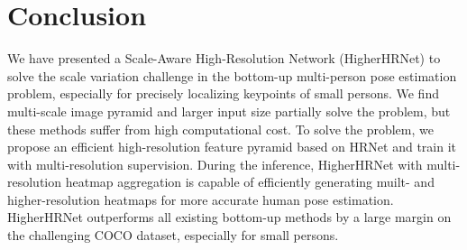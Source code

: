 \documentclass[10pt,twocolumn,letterpaper]{article}
\begin{document}
\vspace{-2mm}
\section{Conclusion}
We have presented a Scale-Aware High-Resolution Network (HigherHRNet) to solve the scale variation challenge in 
the bottom-up multi-person pose estimation problem, 
especially for precisely
localizing keypoints of small persons.
We find multi-scale image pyramid and larger input size partially solve the problem, but these methods suffer from high computational cost. 
To solve the problem, we propose an efficient high-resolution feature pyramid based on HRNet
and train it with multi-resolution supervision. 
During the inference, HigherHRNet with multi-resolution 
heatmap aggregation is capable of efficiently generating muilt- and higher-resolution heatmaps for more accurate human pose estimation.
HigherHRNet outperforms all existing bottom-up methods by a large margin on the challenging COCO dataset, especially for small persons.


{\small


}
\end{document}
